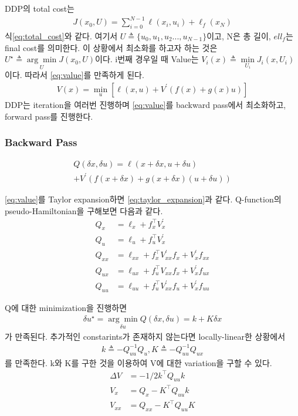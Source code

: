\documentclass[journal]{IEEEtran}
\begin{document}
DDP의 total cost는
\begin{align}
	J(x_0,U)=\sum_{i=0}^{N-1} \ell(x_i,u_i)+\ell_f(x_N)
	\label{eq:total_cost}
\end{align}
식\eqref{eq:total_cost}와 같다. 여기서 $U \triangleq \{u_0,u_1,u_2...,u_{N-1}\}$이고, N은 총 길이, $ell_f$는 final cost를 의미한다.
이 상황에서 최소화를 하고자 하는 것은 $U^{\star}\triangleq\underset{U}{\arg\min} J(x_0,U)$이다.
i번째 경우일 때 Value는 $V_i(x)\triangleq \underset{U_i}{\min}J_i(x,U_i)$이다. 따라서 \eqref{eq:value}를 만족하게 된다.
\begin{align}
	 V(x)=\underset{u}{\min}[\ell(x,u)+V^{\prime}(f(x)+g(x)u)]
	\label{eq:value}
\end{align}
DDP는 iteration을 여러번 진행하며 \eqref{eq:value}를 backward pass에서 최소화하고, forward pass를 진행한다.

\subsubsection{Backward Pass}
\begin{align}
	Q(\delta x,\delta u) =\ell(x+\delta x,u+\delta u)\nonumber\\+V^{\prime}(f(x+\delta x)+g(x+\delta x)(u+\delta u))
	\label{eq:taylor_expansion}
\end{align}

\eqref{eq:value}를 Taylor expansion하면 \eqref{eq:taylor_expansion}과 같다. Q-function의 pseudo-Hamiltonian을 구해보면 다음과 같다.
\begin{align}
	Q_x&=\ell_x+f_x^{\top}V_x^{\prime} \nonumber\\
	Q_u&=\ell_u+f_u^{\top}V_x^{\prime} \nonumber\\
	Q_{xx}&=\ell_{xx}+f_x^{\top}V_{xx}^{\prime}f_x+V_x^{\prime}f_{xx}\nonumber\\
	Q_{ux}&=\ell_{ux}+f_u^{\top}V_{xx}f_x+V_x^{\prime}f_{ux}\nonumber\\
	Q_{uu}&=\ell_{uu}+f_u^{\top}V_{xx}^{\prime}f_u+V_x^{\prime}f_{uu}
	\label{eq:hamitonian}
\end{align}

Q에 대한 minimization을 진행하면
\begin{align}
 	\delta u ^{\star}=\underset{\delta u}{\arg\min} Q(\delta x,\delta u)=k+K\delta x
\end{align}
 가 만족된다.
추가적인 constarints가 존재하지 않는다면 locally-linear한 상황에서
\begin{align}
	k\triangleq-Q_{uu}^{-1}Q_u,
	K\triangleq-Q_{uu}^{-1}Q_{ux}
	\label{eq:kK}
\end{align}
를 만족한다.
k와 K를 구한 것을 이용하여 V에 대한 variation을 구할 수 있다.
\begin{align}
\Delta V&=-1/2k^{\top}Q_{uu}k\nonumber\\
V_x&=Q_x-K^{\top}Q_{uu}k\nonumber\\
V_{xx}&=Q_{xx}-K^{\top}Q_{uu}K
\label{eq:V_variation}
\end{align}
\end{document}
